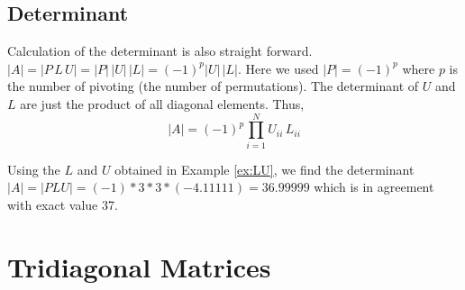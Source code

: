 \subsection{Determinant}

Calculation of the determinant is also straight forward.  $|A| = |P\,L\,U|=|P|\, |U|\, |L| = (-1)^p |U|\, |L|$.  Here we used $|P|=(-1)^p$ where $p$ is the number of pivoting (the number of permutations).
The determinant of $U$ and $L$ are just the product of all diagonal elements.  Thus,
\begin{equation}
|A| = (-1)^p \prod_{i=1}^{N} U_{ii}\, L_{ii}
\end{equation}

\begin{example}
Using the $L$ and $U$ obtained in Example \ref{ex:LU}, we find the determinant $|A| = |PLU| = (-1)*3*3*(-4.11111)= 36.99999$ which is in agreement with exact value 37.
\end{example}

\noindent
\section{Tridiagonal Matrices}

